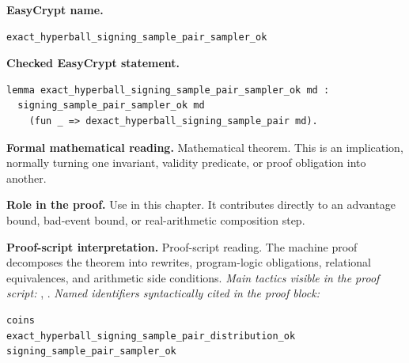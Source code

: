 \begin{formaltheorem}
\noindent\textbf{EasyCrypt name.}
\begin{lstlisting}[language=EasyCrypt,basicstyle=\ttfamily\scriptsize]
exact_hyperball_signing_sample_pair_sampler_ok
\end{lstlisting}
\noindent\textbf{Checked EasyCrypt statement.}
\begin{lstlisting}[language=EasyCrypt,basicstyle=\ttfamily\scriptsize]
lemma exact_hyperball_signing_sample_pair_sampler_ok md :
  signing_sample_pair_sampler_ok md
    (fun _ => dexact_hyperball_signing_sample_pair md).
\end{lstlisting}
\noindent\textbf{Formal mathematical reading.}
Mathematical theorem. This is an implication, normally turning one invariant, validity predicate, or proof obligation into another.

\noindent\textbf{Role in the proof.}
Use in this chapter. It contributes directly to an advantage bound, bad-event bound, or real-arithmetic composition step.

\noindent\textbf{Proof-script interpretation.}
Proof-script reading. The machine proof decomposes the theorem into rewrites, program-logic obligations, relational equivalences, and arithmetic side conditions.
\emph{Main tactics visible in the proof script:} , .
\emph{Named identifiers syntactically cited in the proof block:}
\begin{lstlisting}[language=EasyCrypt,basicstyle=\ttfamily\scriptsize]
coins
exact_hyperball_signing_sample_pair_distribution_ok
signing_sample_pair_sampler_ok
\end{lstlisting}

\end{formaltheorem}

